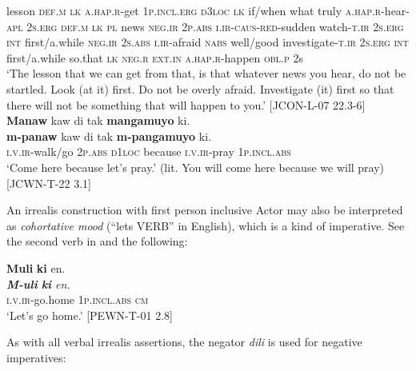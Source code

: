 lesson  \textsc{def.m}  \textsc{lk}  \textsc{a.hap.r}-get  1\textsc{p.incl.erg}  \textsc{d}3\textsc{loc}  \textsc{lk}  if/when  what  truly
\textsc{a.hap.r}-hear-\textsc{apl}  2\textsc{s.erg}  \textsc{def.m}  \textsc{lk}  \textsc{pl}  news  \textsc{neg.ir}  2\textsc{p.abs}
\textsc{i.ir}-\textsc{caus}-\textsc{red}-sudden  watch-\textsc{t.ir}  2\textsc{s.erg}  \textsc{int}  first/a.while  \textsc{neg.ir}  2\textsc{s.abs}
\textsc{i.ir}-afraid  \textsc{nabs}  well/good  investigate-\textsc{t.ir}  2\textsc{s.erg}  \textsc{int}  first/a.while  so.that
\textsc{lk}  \textsc{neg.r}  \textsc{ext.in}  \textsc{a}\textsc{.hap.r}-happen  \textsc{obl.p}  2s \\
\glt `The lesson that we can get from that, is that whatever news you hear, do not be startled. Look (at it) first. Do not be overly afraid. Investigate (it) first so that there will not be something that will happen to you.’ [JCON-L-07 22.3-6]
\z
\ea 
\label{bkm:Ref113956604}
\textbf{Manaw}  kaw  di  tak  \textbf{mangamuyo}  ki. \\\smallskip
\gll \textbf{m-panaw}  kaw  di  tak  \textbf{m-pangamuyo}  ki. \\
\textsc{i.v.ir}-walk/go  2\textsc{p.abs}  \textsc{d}1\textsc{loc}  because  \textsc{i.v.ir}-pray  1\textsc{p.incl.abs} \\
\glt ‘Come here because let’s pray.’ (lit. You will come here because we will pray) [JCWN-T-22 3.1]
\z

An irrealis construction with first person inclusive Actor may also be interpreted as \textit{cohortative mood} (“lets VERB” in English), which is a kind of imperative. See the second verb in  and the following:

\ea 
\textbf{Muli}  \textbf{ki}  en. \\\smallskip
\gll \textit{\textbf{M-uli}  \textbf{ki}  en}. \\
\textsc{i.v.ir}-go.home  1\textsc{p.incl.abs}  \textsc{cm} \\
\glt ‘Let’s go home.’ [PEWN-T-01 2.8]
\z

As with all verbal irrealis assertions, the negator \textit{dili} is used for negative imperatives:

